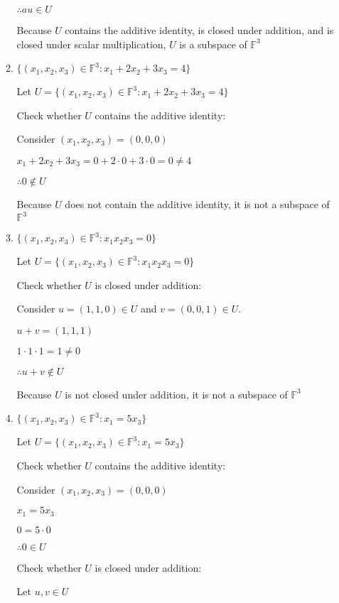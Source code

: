 \documentclass{article}
\begin{document}
\begin{enumerate}[nolistsep]
\begin{enumerate}[nolistsep]
			$\therefore au \in U$
			
			Because $U$ contains the additive identity, is closed under addition, and is closed under scalar multiplication, $U$ is a subspace of $\mathbb{F}^3$
			
			\item ${\{(x_1, x_2, x_3) \in \mathbb{F}^3 : x_1 + 2x_2 + 3x_3 = 4 \}}$
			
			Let $U = {\{(x_1, x_2, x_3) \in \mathbb{F}^3 : x_1 + 2x_2 + 3x_3 = 4 \}}$
			
			Check whether $U$ contains the additive identity:
			
			Consider $(x_1, x_2, x_3) = (0, 0, 0)$
			
			$x_1 + 2x_2 + 3x_3 = 0 + 2 \cdot 0 + 3 \cdot 0 = 0 \neq 4$
			
			$\therefore 0 \notin U$
			
			Because $U$ does not contain the additive identity, it is not a subspace of $\mathbb{F}^3$

			\item ${\{(x_1, x_2, x_3) \in \mathbb{F}^3 : x_1x_2x_3 = 0 \}}$
			
			Let $U = {\{(x_1, x_2, x_3) \in \mathbb{F}^3 : x_1x_2x_3 = 0 \}}$
			
			Check whether $U$ is closed under addition:
			
			Consider $u = (1, 1, 0) \in U$ and $v = (0, 0, 1) \in U$.
			
			$u + v = (1, 1, 1)$
			
			$1 \cdot 1 \cdot 1 = 1 \neq 0$
			
			$\therefore u + v \notin U$
			
			Because $U$ is not closed under addition, it is not a subspace of $\mathbb{F}^3$
			
			\item ${\{(x_1, x_2, x_3) \in \mathbb{F}^3 : x_1 = 5x_3 \}}$
			
			Let $U = \{(x_1, x_2, x_3) \in \mathbb{F}^3 : x_1 = 5x_3 \}$
			
			Check whether $U$ contains the additive identity:
			
			Consider $(x_1, x_2, x_3) = (0, 0, 0)$
			
			$x_1 = 5x_3$
			
			$0 = 5 \cdot 0$
			
			$\therefore 0 \in U$
			
			Check whether $U$ is closed under addition:
			
			Let $u, v \in U$
			

\end{enumerate}
\end{enumerate}
\end{document}
